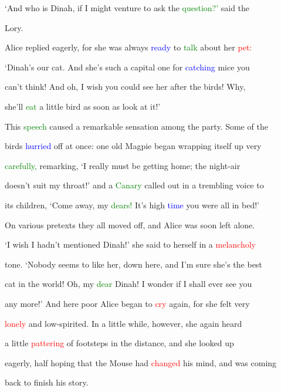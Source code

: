 ‘And who is Dinah, if I might venture to ask the \textcolor{green}{question?’} said the

 Lory.



 Alice replied eagerly, for she was always \textcolor{blue}{ready} to \textcolor{green}{talk} about her \textcolor{red}{pet:}

 ‘Dinah’s our cat. And she’s such a capital one for \textcolor{blue}{catching} mice you

 can’t think! And oh, I wish you could see her after the birds! Why,

 \textcolor{BurntOrange}{she’ll} \textcolor{green}{eat} a little bird as soon as look at it!’



 This \textcolor{green}{speech} caused a \textcolor{BurntOrange}{remarkable} sensation among the party. Some of the

 birds \textcolor{blue}{hurried} off at once: one old Magpie began wrapping itself up very

 \textcolor{green}{carefully,} remarking, ‘I really must be getting home; the night-air

 doesn’t suit my throat!’ and a \textcolor{green}{Canary} called out in a trembling voice to

 its \textcolor{BurntOrange}{children,} ‘Come away, my \textcolor{green}{dears!} It’s high \textcolor{blue}{time} you were all in bed!’

 On various pretexts they all moved off, and Alice was soon left alone.



 ‘I wish I hadn’t mentioned Dinah!’ she said to herself in a \textcolor{red}{melancholy}

 tone. ‘Nobody seems to like her, down here, and I’m sure she’s the best

 cat in the world! Oh, my \textcolor{green}{dear} Dinah! I wonder if I shall ever see you

 any more!’ And here poor Alice began to \textcolor{red}{cry} again, for she felt very

 \textcolor{red}{lonely} and low-spirited. In a little while, however, she again heard

 a little \textcolor{red}{pattering} of footsteps in the distance, and she looked up

 eagerly, half hoping that the Mouse had \textcolor{red}{changed} his mind, and was coming

 back to finish his story.









